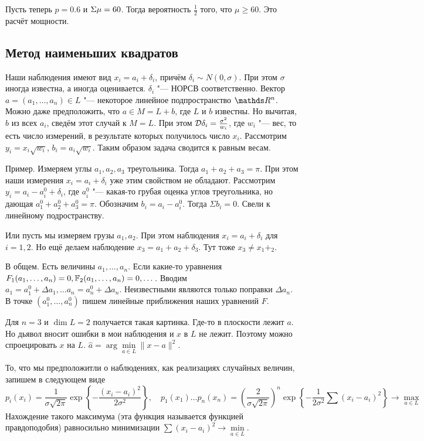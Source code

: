 Пусть теперь $p=0.6$ и $\Sigma\mu=60$. Тогда вероятность $\frac12$ того, что $\mu\ge 60$. Это расчёт мощности.

\subsection{Метод наименьших квадратов}
Наши наблюдения имеют вид $x_i = a_i + \delta_i$, причём $\delta_i \sim N(0,\sigma)$. При этом $\sigma$ иногда известна, а иногда оценивается. $\delta_i$ "--- НОРСВ соответственно. Вектор $a = (a_1,\dots,a_n) \in L$ "--- некоторое линейное подпространство $\R^n$. Можно даже предположить, что $a\in M = L +b$, где $L$ и $b$ известны. Но вычитая, $b$ из всех $a_i$, сведём этот случай к $M=L$. При этом $\mathcal D\delta_i = \frac{\sigma^2}{w_i}$, где $w_i$ "--- вес, то есть число измерений, в результате которых получилось число $x_i$. Рассмотрим $y_i = x_i \sqrt{w_i}$, $b_i = a_i\sqrt{w_i}$. Таким образом задача сводится к равным весам.

Пример. Измеряем углы $a_1,a_2,a_3$ треугольника. Тогда $a_1+a_2+a_3 = \pi$. При этом наши измерения $x_i = a_i + \delta_i$ уже этим свойством не обладают. Рассмотрим $y_i = a_i - a_i^0 + \delta_i$, где $a_i^0$ "--- какая-то грубая оценка углов треугольника, но дающая $a_1^0 + a_2^0 + a_3^0 = \pi$. Обозначим $b_i = a_i - a_i^0$. Тогда $\Sigma b_i = 0$. Свели к линейному подространству.

Или пусть мы измеряем грузы $a_1,a_2$. При этом наблюдения $x_i = a_i + \delta_i$ для $i=1,2$. Но ещё делаем наблюдение $x_3 = a_1 + a_2 + \delta_3$. Тут тоже $x_3\ne x_1+_2$.

В общем. Есть величины $a_1,\dots, a_n$. Если какие-то уравнения $F_1(a_1,\dots, a_n) = 0,\mathbb F_2(a_1,\dots,a_n) = 0, \dots$. Вводим $a_1 = a_1^0 + \Delta a_1,\dots a_n = a_n^0 + \Delta a_n$. Неизвестными являются только поправки $\Delta a_n$. В точке $(a_1^0,\dots, a_n^0)$ пишем линейные приближения наших уравнений $F$.

Для $n=3$ и $\dim L = 2$ получается такая картинка. Где-то в плоскости лежит $a$. Но дьявол вносит ошибки в мои наблюдения и $x$ в $L$ не лежит. Поэтому можно спроецировать $x$ на $L$. $\hat a = \arg \min\limits_{a\in L}\|x-a\|^2$.

То, что мы предположитли о наблюдениях, как реализациях случайных величин, запишем в следующем виде
\[
  p_i(x_i) = \frac{1}{\sigma\sqrt{2\pi}}\exp\left\{ -\frac{(x_i-a_i)^2}{2\sigma^2} \right\},\quad
  p_1(x_1)\dots p_n(x_n) = \left( \frac{2}{\sigma\sqrt{2\pi}} \right)^n\exp\left\{ -\frac{1}{2\sigma^2}\sum(x_i-a_i)^2 \right\}\to \max\limits_{a\in L}
\]
Нахождение такого максимума (эта функция называется функцией правдоподобия) равносильно минимизации $\sum(x_i-a_i)^2\to\min\limits_{a\in L}$.

